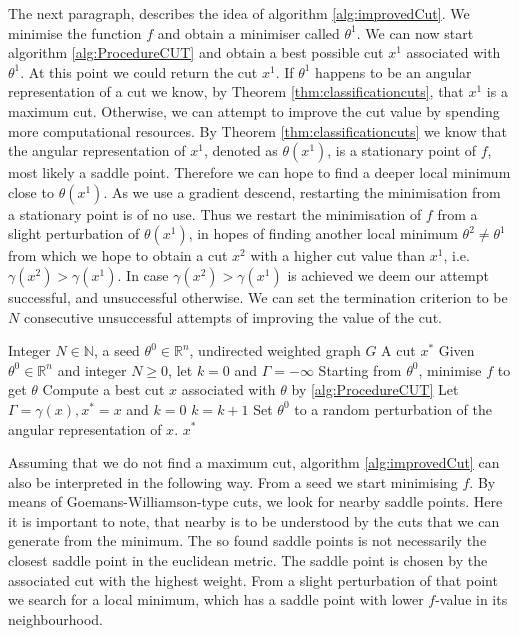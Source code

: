 \documentclass[12pt,a4paper]{article}
\theoremstyle{mythm}
\begin{document}
The next paragraph, describes the idea of algorithm \ref{alg:improvedCut}.
We minimise the function $ f $ and obtain a minimiser called $ \theta^1 $. 
We can now start algorithm \ref{alg:ProcedureCUT} and obtain a best possible cut $ x^1 $ associated with $ \theta^1 $.
At this point we could return the cut $ x^1 $.
If $ \theta^1 $ happens to be an angular representation of a cut we know, by Theorem \ref{thm:classificationcuts}, that $ x^1 $ is a maximum cut.
Otherwise, we can attempt to improve the cut value by spending more computational resources. 
By Theorem \ref{thm:classificationcuts} we know that the angular representation of $ x^1 $, denoted as $ \theta ( x^1)  $, is a stationary point of $ f $, most likely a
saddle point. 
Therefore we can hope to find a deeper local minimum close to $ \theta ( x^1) $.
As we use a gradient descend, restarting the minimisation from a stationary point is of no use.
Thus we restart the minimisation of $ f $ from a slight perturbation of $ \theta (x^1) $, in hopes of finding another local minimum $ \theta^2 \neq \theta^1  $ from which we
hope to obtain a cut $ x^2 $ with a higher cut value than $ x^1 $, i.e. $ \gamma (x^2) > \gamma (x^1)  $.
In case $ \gamma (x^2) > \gamma (x^1) $ is achieved we deem our attempt successful, and unsuccessful otherwise.
We can set the termination criterion to be $ N $ consecutive unsuccessful attempts of improving the value of the cut.
\begin{algorithm}
\caption{\ImprovedCut}
\label{alg:improvedCut} 
\begin{algorithmic}[1]
\Require Integer $ N \in \mathbb{N}  $, a seed $ \theta^0 \in \mathbb{R} ^{ n }  $, undirected weighted graph $ G $
\Ensure A cut $ x^* $
\State Given $ \theta^0 \in \mathbb{R} ^{ n }  $ and integer $ N \geq 0  $, let $ k=0 $ and $ \Gamma = - \infty  $
\State Starting from $ \theta^0 $, minimise $ f $ to get $ \theta  $
\State Compute a best cut $ x $ associated with $ \theta $ by \ref{alg:ProcedureCUT} 
\State Let $ \Gamma = \gamma (x), x^* = x $ and $ k=0 $
\Else
\State $ k = k+1 $
\EndIf
\State Set $ \theta^0 $ to a random perturbation of the angular representation of $ x $.
\EndWhile
\State \Return $ x ^{ * }  $
\EndProcedure
\end{algorithmic}
\end{algorithm}

Assuming that we do not find a maximum cut, algorithm \ref{alg:improvedCut} can also be interpreted in the following way.
From a seed we start minimising $ f $. By means of Goemans-Williamson-type cuts, we look for nearby saddle points. 
Here it is important to note, that nearby is to be understood by the cuts that we can generate from the minimum. The so found saddle points is not necessarily
the closest saddle point in the euclidean metric.
The saddle point is chosen by the associated cut with the highest weight.
From a slight perturbation of that point we search for a local minimum, which has a saddle point with lower $ f $-value in its neighbourhood.
\end{document}
